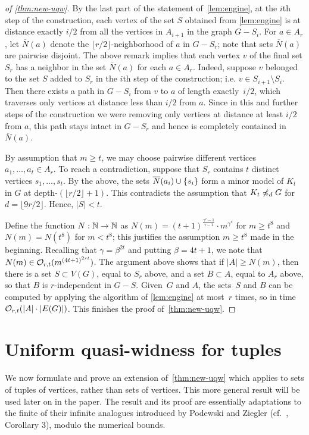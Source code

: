 \begin{proof}[of \cref{thm:new-uqw}]
By the last part of the statement of~\cref{lem:engine},  at the $i$th step of the construction, each vertex of the set $S$ obtained from \cref{lem:engine}
is at distance exactly $i/2$ from all the vertices in $A_{i+1}$ in the graph 
$G-S_i$. 
For $a\in A_r$, let $\overline{N}(a)$ denote the $\lfloor r/2\rfloor$-neighborhood of $a$ in $G-S_r$; note that sets $\overline{N}(a)$ are pairwise disjoint.
The above remark implies that each vertex $v$ of the final set $S_r$ has a neighbor in the set $\overline{N}(a)$ for each $a\in A_r$.
Indeed, suppose $v$ belonged to the set $S$ added to $S_r$ in the $i$th step of the construction; i.e. $v\in S_{i+1}\setminus S_i$.
Then there exists a path in $G-S_i$ from $v$ to $a$ of length exactly~$i/2$, which traverses only vertices at distance less than $i/2$ from $a$.
Since in this and further steps of the construction we were removing only vertices at distance at least $i/2$ from $a$, this path stays intact in $G-S_r$ and hence is completely contained in $\overline{N}(a)$.

By assumption that $m\ge t$, we may choose pairwise different vertices $a_1,\ldots,a_t\in A_r$.
To reach a contradiction, suppose that $S_r$ contains $t$ distinct vertices $s_1,\ldots,s_t$. 
By the above, the sets $\overline{N}(a_i)\cup\{s_i\}$ 
form a minor model of $K_t$ in $G$ at depth-$(\lfloor r/2\rfloor+1)$.
This contradicts the assumption that $K_t\not\preccurlyeq_d G$ for $d=\lfloor 9r/2 \rfloor$.
Hence, $|S|<t$.

Define the function  $N:\mathbb{N}\to\mathbb{N}$
as $N(m)=(t+1)^{\frac{\gamma^{r}-1}{\gamma-1}}\cdot m^{\gamma^{r}}$
for $m\ge t^8$ and $N(m)=N(t^8)$ for $m<t^8$; this justifies the assumption $m\geq t^8$ made in the beginning.
Recalling that $\gamma=\beta^{2t}$ and putting $\beta=4t+1$, we
note that $N(m)\in \mathcal{O}_{r,t}{(m^{{(4t+1)}^{2rt}})}$.
The argument above shows that if $|A|\ge N(m)$, then 
there is a set $S\subset V(G)$, equal to $S_r$ above,
and a set $B\subset A$, equal to $A_r$ above,
so that $B$ is $r$-independent in $G-S$.
Given~$G$ and $A$, the sets~$S$ and $B$ can be computed by applying the algorithm of \cref{lem:engine} at most~$r$ times, so in time $\mathcal{O}_{r,t}(|A|\cdot |E(G)|)$.
This finishes the proof of~\cref{thm:new-uqw}.
\end{proof}



\section{Uniform quasi-widness for tuples}\label{sec:uqw-tuples}
We now formulate and prove an extension of~\cref{thm:new-uqw}
which applies to sets of tuples of vertices, rather than sets of vertices. 
This more general result will be used later on in the paper. 
The result and its proof are essentially adaptations to the finite of their infinite analogues introduced by Podewski and Ziegler (cf.~\cite{podewski1978stable},  Corollary 3),
modulo the numerical bounds.


